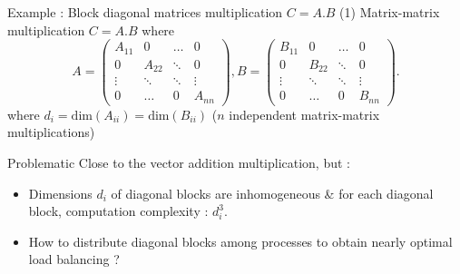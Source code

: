 \documentclass[compress,10pt,aspectratio=169]{beamer}
\begin{document}
\begin{frame}[fragile]{Example : Block diagonal matrices multiplication $C = A.B$ (1)}
    \scriptsize
    Matrix-matrix multiplication $C = A.B$ where
        \[
            A = \left(
                \begin{array}{cccc}
                    A_{11} & 0 & \ldots & 0 \\
                      0    & A_{22} & \ddots & 0 \\
                      \vdots & \ddots & \ddots & \vdots \\
                      0 & \ldots & 0 & A_{nn} 
                \end{array}\right),
            B = \left(
                \begin{array}{cccc}
                    B_{11} & 0 & \ldots & 0 \\
                      0    & B_{22} & \ddots & 0 \\
                      \vdots & \ddots & \ddots & \vdots \\
                      0 & \ldots & 0 & B_{nn} 
                \end{array}\right).
        \]
    where $d_{i} = \mbox{dim}(A_{ii}) = \mbox{dim}(B_{ii})$ ($n$ independent matrix-matrix multiplications)

    \begin{block}{\small Problematic}
        Close to the vector addition multiplication, but :
        \begin{itemize}
            \item Dimensions $d_i$ of diagonal blocks are inhomogeneous \& for each diagonal 
                  block, computation complexity : $d_{i}^{3}$.
            \item How to distribute diagonal blocks among processes to obtain nearly optimal load balancing ?
        \end{itemize}
    \end{block}
\end{frame}
\end{document}
